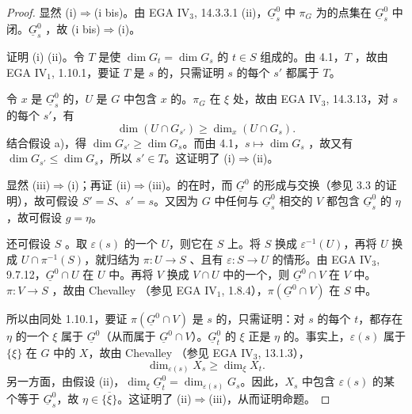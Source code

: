 \begin{proof}
显然 (i)$\Rightarrow$(i bis)。由 EGA IV$_3$, 14.3.3.1 (ii)，$\underline G_s^0$ 中 $\pi_G$ 为的点集在 $\underline G_s^0$ 中闭。$\underline G_s^0$ ，故 (i bis)$\Rightarrow$(i)。

证明 (i)  (ii)。令 $T$ 是使 $\dim G_t=\dim G_s$ 的 $t\in S$ 组成的。由 4.1，$T$ ，故由 EGA IV$_1$, 1.10.1，要证 $T$ 是 $s$ 的，只需证明 $s$ 的每个 $s'$ 都属于 $T$。

令 $x$ 是 $\underline G_s^0$ 的，$U$ 是 $G$ 中包含 $x$ 的。$\pi_G$ 在 $\xi$ 处，故由 EGA IV$_3$, 14.3.13，对 $s$ 的每个 $s'$，有
\[
\dim(U\cap G_{s'})\geq\dim_x(U\cap G_s).
\]
结合假设 a)，得 $\dim G_{s'}\geq\dim G_s$。而由 4.1，$s\mapsto\dim G_s$ ，故又有 $\dim G_{s'}\leq\dim G_s$，所以 $s'\in T$。这证明了 (i)$\Rightarrow$(ii)。

显然 (iii)$\Rightarrow$(i)；再证 (ii)$\Rightarrow$(iii)。的在时，而 $\underline G^0$ 的形成与交换（参见 3.3 的证明），故可假设 $S'=S$、$s'=s$。又因为 $G$ 中任何与 $\underline G_s^0$ 相交的 $V$ 都包含 $\underline G_s^0$ 的 $\eta$，故可假设 $g=\eta$。

还可假设 $S$ 。取 $\varepsilon(s)$ 的一个 $U$，则它在 $S$ 上。将 $S$ 换成 $\varepsilon^{-1}(U)$，再将 $U$ 换成 $U\cap\pi^{-1}(S)$，就归结为 $\pi:U\to S$ 、且有 $\varepsilon:S\to U$ 的情形。由 EGA IV$_3$, 9.7.12，$\underline G^0\cap U$ 在 $U$ 中。再将 $V$ 换成 $V\cap U$ 中的一个，则 $\underline G^0\cap V$ 在 $V$ 中。$\pi:V\to S$ ，故由 Chevalley （参见 EGA IV$_1$, 1.8.4），$\pi(\underline G^0\cap V)$ 在 $S$ 中。

所以由同处 1.10.1，要证 $\pi(\underline G^0\cap V)$ 是 $s$ 的，只需证明：对 $s$ 的每个 $t$，都存在 $\eta$ 的一个 $\xi$ 属于 $\underline G^0$（从而属于 $\underline G^0\cap V$）。$\underline G_t^0$ 的 $\xi$ 正是 $\eta$ 的。事实上，$\varepsilon(s)$ 属于 $\{\xi\}$ 在 $G$ 中的 $X$，故由 Chevalley （参见 EGA IV$_3$, 13.1.3），
\[
\dim_{\varepsilon(s)}X_s\geq\dim_\xi X_t.
\]
另一方面，由假设 (ii)，$\dim_\xi\underline G_t^0=\dim_{\varepsilon(s)}G_s$。因此，$X_s$ 中包含 $\varepsilon(s)$ 的某个等于 $\underline G_s^0$，故 $\eta\in\overline{\{\xi\}}$。这证明了 (ii)$\Rightarrow$(iii)，从而证明命题。


\end{proof}
